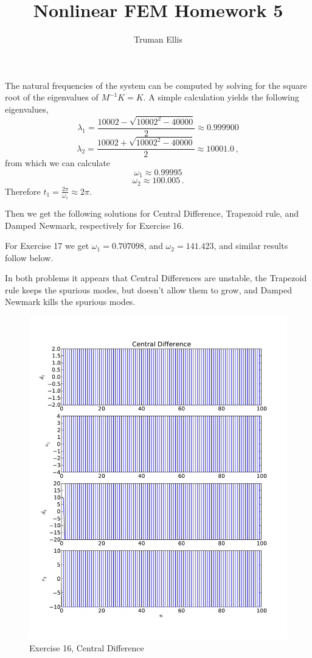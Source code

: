 \documentclass[12pt]{article}
\title{Nonlinear FEM Homework 5}
\author{Truman Ellis}
\date{}
\begin{document}
\maketitle

The natural frequencies of the system can be computed by solving for the
square root of the eigenvalues of $M^{-1}K=K$. A simple calculation yields the
following eigenvalues,
\[
\lambda_1 = \frac{10002-\sqrt{10002^2-40000}}{2}\approx0.999900
\]
\[
\lambda_2 = \frac{10002+\sqrt{10002^2-40000}}{2}\approx10001.0\,,
\]
from which we can calculate
\[
\omega_1 \approx 0.99995
\]
\[
\omega_2 \approx 100.005\,.
\]
Therefore $t_1=\frac{2\pi}{\omega_1}\approx 2\pi$.

Then we get the following solutions for Central Difference, Trapezoid rule,
and Damped Newmark, respectively for Exercise 16. 

For Exercise 17 we get $\omega_1=0.707098$, and $\omega_2=141.423$, and
similar results follow below.

In both problems it appears that Central Differences are unstable, the
Trapezoid rule keeps the spurious modes, but doesn't allow them to grow, and
Damped Newmark kills the spurious modes.

\begin{figure}[h!]
\centering
\includegraphics[height=0.9\textheight]{cd1.pdf}
\caption{Exercise 16, Central Difference}
\end{figure}
\end{document}
